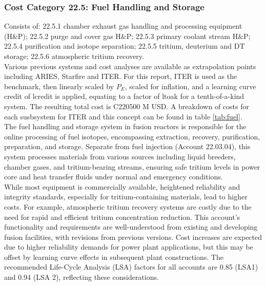 \subsubsection{Cost Category 22.5: Fuel Handling and Storage}

Consists of: 22.5.1 chamber exhaust gas handling and processing equipment (H\&P); 22.5.2 purge and cover gas H\&P; 22.5.3 primary coolant stream H\&P; 22.5.4 purification and isotope separation; 22.5.5 tritium, deuterium and DT storage; 22.5.6 atmospheric tritium recovery.\\

Various previous systems and cost analyses are available as extrapolation points including ARIES, Starfire and ITER. For this report, ITER is used as the benchmark, then linearly scaled by $P_E$, scaled for inflation, and a learning curve credit of lcredit is applied, equating to a factor of ltoak for a tenth-of-a-kind system. The resulting total cost is C220500 M USD. A breakdown of costs for each susbsystem for ITER and this concept can be found in table \ref{tab:fuel}.\\

The fuel handling and storage system in fusion reactors is responsible for the online processing of fuel isotopes, encompassing extraction, recovery, purification, preparation, and storage. Separate from fuel injection (Account 22.03.04), this system processes materials from various sources including liquid breeders, chamber gases, and tritium-bearing streams, ensuring safe tritium levels in power core and heat transfer fluids under normal and emergency conditions.\\

While most equipment is commercially available, heightened reliability and integrity standards, especially for tritium-containing materials, lead to higher costs. For example, atmospheric tritium recovery systems are costly due to the need for rapid and efficient tritium concentration reduction. This account's functionality and requirements are well-understood from existing and developing fusion facilities, with revisions from previous versions. Cost increases are expected due to higher reliability demands for power plant applications, but this may be offset by learning curve effects in subsequent plant constructions. The recommended Life-Cycle Analysis (LSA) factors for all accounts are 0.85 (LSA1) and 0.94 (LSA 2), reflecting these considerations.


